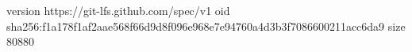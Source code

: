 version https://git-lfs.github.com/spec/v1
oid sha256:f1a178f1af2aae568f66d9d8f096e968e7e94760a4d3b3f7086600211acc6da9
size 80880
